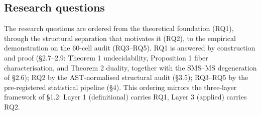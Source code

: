 \documentclass[acmsmall,screen,review]{acmart}
\begin{document}
\subsection{Research questions}\label{research-questions}

The research questions are ordered from the theoretical foundation
(RQ1), through the structural separation that motivates it (RQ2), to the
empirical demonstration on the 60-cell audit (RQ3--RQ5). RQ1 is answered
by construction and proof (§2.7--2.9: Theorem 1 undecidability,
Proposition 1 fiber characterisation, and Theorem 2 duality, together
with the SMS--MS degeneration of §2.6); RQ2 by the
AST-normalised structural audit (§3.5); RQ3--RQ5 by the pre-registered
statistical pipeline (§4). This ordering mirrors the three-layer
framework of §1.2: Layer 1 (definitional) carries RQ1, Layer 3 (applied)
carries RQ2.
\end{document}
